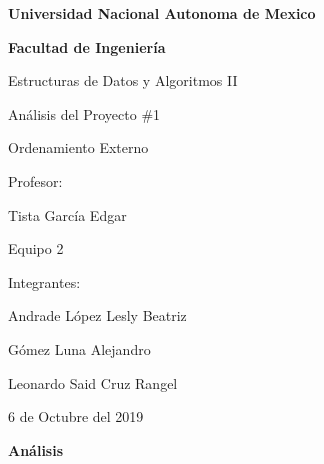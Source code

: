 \documentclass[12pt,letterpaper]{article}
\begin{document}
\begin{titlepage}
	\centering
	\Huge\textbf{Universidad Nacional Autonoma de Mexico}\par
	\vspace{1cm}
	\Huge\textbf{Facultad de Ingeniería}\par
	\vspace{1.5cm}
	\huge Estructuras de Datos y Algoritmos II\par
	\vspace{1.5cm}
	\huge Análisis del Proyecto \#1\par
	\vspace{0.3cm}
	\huge Ordenamiento Externo\par
	\vspace{1.5cm}
	\LARGE Profesor:\par
	\vspace{0.2cm}
	\Large Tista García Edgar\par
	\vspace{1cm}
	\LARGE Equipo 2\par	
	\vspace{1cm}
	\LARGE Integrantes:\par	
	\vspace{0.2cm}
	\Large Andrade López Lesly Beatriz\par
	\Large Gómez Luna Alejandro\par
	\Large Leonardo Said Cruz Rangel\par
	\vspace{2cm}
	\Large{6 de Octubre del 2019}
\end{titlepage}
\setlength{\parindent}{4em}
\LARGE\textbf{An\'alisis}\par
\vspace{0.5cm}
\end{document}
